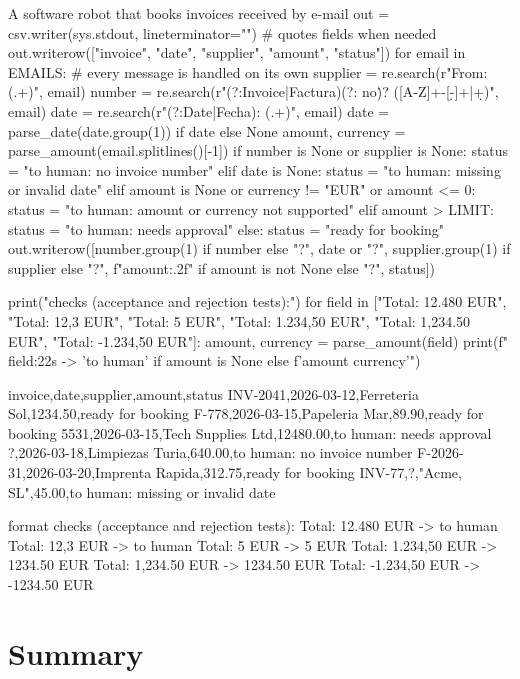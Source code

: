 \begin{pylisting}[label={lst:rpa}]{A software robot that books invoices received by e-mail}
out = csv.writer(sys.stdout, lineterminator="\n")  # quotes fields when needed
out.writerow(["invoice", "date", "supplier", "amount", "status"])
for email in EMAILS:                               # every message is handled on its own
    supplier = re.search(r"From: (.+)", email)
    number = re.search(r"(?:Invoice|Factura)(?: no\.)? ([A-Z]+-[\d-]+|\d+)", email)
    date = re.search(r"(?:Date|Fecha): (.+)", email)
    date = parse_date(date.group(1)) if date else None
    amount, currency = parse_amount(email.splitlines()[-1])
    if number is None or supplier is None:
        status = "to human: no invoice number"
    elif date is None:
        status = "to human: missing or invalid date"
    elif amount is None or currency != "EUR" or amount <= 0:
        status = "to human: amount or currency not supported"
    elif amount > LIMIT:
        status = "to human: needs approval"
    else:
        status = "ready for booking"
    out.writerow([number.group(1) if number else "?", date or "?",
                  supplier.group(1) if supplier else "?",
                  f"{amount:.2f}" if amount is not None else "?", status])

print("\nformat checks (acceptance and rejection tests):")
for field in ["Total: 12.480 EUR", "Total: 12,3 EUR", "Total: 5 EUR",
              "Total: 1.234,50 EUR", "Total: 1,234.50 EUR", "Total: -1.234,50 EUR"]:
    amount, currency = parse_amount(field)
    print(f"  {field:22s} -> {'to human' if amount is None else f'{amount} {currency}'}")
\end{pylisting}
\begin{pyoutput}
invoice,date,supplier,amount,status
INV-2041,2026-03-12,Ferreteria Sol,1234.50,ready for booking
F-778,2026-03-15,Papeleria Mar,89.90,ready for booking
5531,2026-03-15,Tech Supplies Ltd,12480.00,to human: needs approval
?,2026-03-18,Limpiezas Turia,640.00,to human: no invoice number
F-2026-31,2026-03-20,Imprenta Rapida,312.75,ready for booking
INV-77,?,"Acme, SL",45.00,to human: missing or invalid date

format checks (acceptance and rejection tests):
  Total: 12.480 EUR      -> to human
  Total: 12,3 EUR        -> to human
  Total: 5 EUR           -> 5 EUR
  Total: 1.234,50 EUR    -> 1234.50 EUR
  Total: 1,234.50 EUR    -> 1234.50 EUR
  Total: -1.234,50 EUR   -> -1234.50 EUR
\end{pyoutput}

\section{Summary}\label{sec:summary4}

